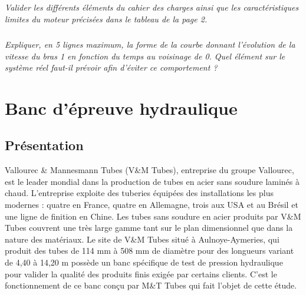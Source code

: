 \documentclass[10pt,fleqn]{article} %
\begin{document}
\subparagraph{}
\textit{Valider les différents éléments du cahier des charges ainsi que les caractéristiques limites du moteur précisées dans le tableau de la page 2.
}

\subparagraph{}
\textit{Expliquer, en 5 lignes maximum,  la forme de la courbe donnant l’évolution de la vitesse du bras 1 en fonction du temps au voisinage de 0. Quel élément sur le système réel faut-il prévoir afin d’éviter ce comportement ?}

\newpage

\section{Banc d'épreuve hydraulique}
\subsection{Présentation}
Vallourec \& Mannesmann Tubes (V\&M Tubes), entreprise du groupe Vallourec, est le leader mondial dans la production de tubes en acier sans soudure laminés à chaud. L’entreprise exploite des tuberies équipées des installations les plus modernes : quatre en France, quatre en Allemagne, trois  aux USA et au Brésil et une ligne de finition en Chine.
Les tubes sans soudure en acier produits par V\&M Tubes couvrent une très large gamme tant sur le plan dimensionnel que dans la nature des matériaux.
Le site de V\&M Tubes situé à Aulnoye-Aymeries, qui produit des tubes de 114 mm à 508 mm de diamètre pour des longueurs variant de 4,40 à 14,20 m possède un banc spécifique de test de pression hydraulique pour valider la qualité des produits finis exigée par certains clients. C’est le fonctionnement de ce banc conçu par M\&T Tubes qui fait l’objet de cette étude.
\end{document}
